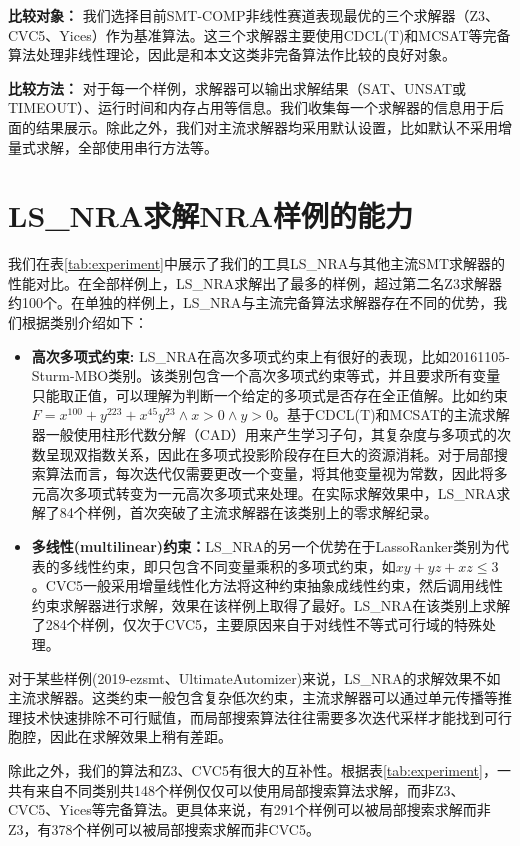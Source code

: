  \textbf{比较对象：} 我们选择目前SMT-COMP非线性赛道表现最优的三个求解器（Z3\cite{MouraB08}、CVC5\cite{BarbosaBBKLMMMN22}、Yices\cite{Dutertre14}）作为基准算法。这三个求解器主要使用CDCL(T)和MCSAT等完备算法处理非线性理论，因此是和本文这类非完备算法作比较的良好对象。

\textbf{比较方法：} 对于每一个样例，求解器可以输出求解结果（SAT、UNSAT或TIMEOUT）、运行时间和内存占用等信息。我们收集每一个求解器的信息用于后面的结果展示。除此之外，我们对主流求解器均采用默认设置，比如默认不采用增量式求解，全部使用串行方法等。

\section{LS\_NRA求解NRA样例的能力}
我们在表\ref{tab:experiment}中展示了我们的工具LS\_NRA与其他主流SMT求解器的性能对比。在全部样例上，LS\_NRA求解出了最多的样例，超过第二名Z3求解器约100个。在单独的样例上，LS\_NRA与主流完备算法求解器存在不同的优势，我们根据类别介绍如下：
\begin{itemize}
    \item \textbf{高次多项式约束:} 
    LS\_NRA在高次多项式约束上有很好的表现，比如20161105-Sturm-MBO类别。该类别包含一个高次多项式约束等式，并且要求所有变量只能取正值，可以理解为判断一个给定的多项式是否存在全正值解。比如约束$F = x^100 + y^ 223 + x^45 y^23 \wedge x > 0 \wedge y > 0$。基于CDCL(T)和MCSAT的主流求解器一般使用柱形代数分解（CAD）用来产生学习子句，其复杂度与多项式的次数呈现双指数关系，因此在多项式投影阶段存在巨大的资源消耗。对于局部搜索算法而言，每次迭代仅需要更改一个变量，将其他变量视为常数，因此将多元高次多项式转变为一元高次多项式来处理。在实际求解效果中，LS\_NRA求解了84个样例，首次突破了主流求解器在该类别上的零求解纪录。

    \item \textbf{多线性(multilinear)约束：}LS\_NRA的另一个优势在于LassoRanker类别为代表的多线性约束，即只包含不同变量乘积的多项式约束，如$x y + y z + x z \leq 3$。CVC5一般采用增量线性化方法将这种约束抽象成线性约束，然后调用线性约束求解器进行求解，效果在该样例上取得了最好。LS\_NRA在该类别上求解了284个样例，仅次于CVC5，主要原因来自于对线性不等式可行域的特殊处理。
\end{itemize}

对于某些样例(2019-ezsmt、UltimateAutomizer)来说，LS\_NRA的求解效果不如主流求解器。这类约束一般包含复杂低次约束，主流求解器可以通过单元传播等推理技术快速排除不可行赋值，而局部搜索算法往往需要多次迭代采样才能找到可行胞腔，因此在求解效果上稍有差距。

除此之外，我们的算法和Z3、CVC5有很大的互补性。根据表\ref{tab:experiment}，一共有来自不同类别共148个样例仅仅可以使用局部搜索算法求解，而非Z3、CVC5、Yices等完备算法。更具体来说，有291个样例可以被局部搜索求解而非Z3，有378个样例可以被局部搜索求解而非CVC5。

